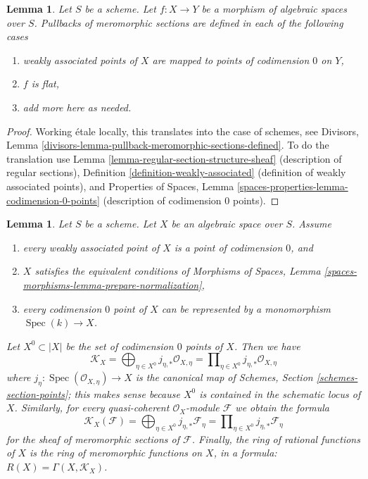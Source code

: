 \documentclass{stacks-project}
\theoremstyle{plain}
\newtheorem{lemma}[subsection]{Lemma}
\theoremstyle{definition}
\theoremstyle{remark}
\numberwithin{equation}{subsection}
\def\Spec{\mathop{\mathrm{Spec}}}
\begin{document}
\begin{lemma}
\label{lemma-pullback-meromorphic-sections-defined}
Let $S$ be a scheme. Let $f : X \to Y$ be a morphism of algebraic spaces
over $S$. Pullbacks of meromorphic sections are defined
in each of the following cases
\begin{enumerate}
\item weakly associated points of $X$ are mapped
to points of codimension $0$ on $Y$,
\item $f$ is flat,
\item add more here as needed.
\end{enumerate}
\end{lemma}

\begin{proof}
Working \'etale locally, this translates into the case of schemes, see
Divisors, Lemma \ref{divisors-lemma-pullback-meromorphic-sections-defined}.
To do the translation use Lemma \ref{lemma-regular-section-structure-sheaf}
(description of regular sections),
Definition \ref{definition-weakly-associated} (definition
of weakly associated points), and
Properties of Spaces, Lemma \ref{spaces-properties-lemma-codimension-0-points}
(description of codimension $0$ points).
\end{proof}

\begin{lemma}
\label{lemma-compute-meromorphic}
Let $S$ be a scheme. Let $X$ be an algebraic space over $S$. Assume
\begin{enumerate}
\item[(a)] every weakly associated point of $X$
is a point of codimension $0$, and
\item[(b)] $X$ satisfies the equivalent conditions
of Morphisms of Spaces, Lemma
\ref{spaces-morphisms-lemma-prepare-normalization},
\item[(c)] every codimension $0$ point of $X$ can be represented
by a monomorphism $\Spec(k) \to X$.
\end{enumerate}
Let $X^0 \subset |X|$ be the set of codimension $0$ points of $X$.
Then we have
$$
\mathcal{K}_X =
\bigoplus\nolimits_{\eta \in X^0} j_{\eta, *}\mathcal{O}_{X, \eta} =
\prod\nolimits_{\eta \in X^0} j_{\eta, *}\mathcal{O}_{X, \eta}
$$
where $j_\eta : \Spec(\mathcal{O}_{X, \eta}) \to X$ is the canonical map
of Schemes, Section \ref{schemes-section-points}; this makes sense because
$X^0$ is contained in the schematic locus of $X$. Similarly,
for every quasi-coherent $\mathcal{O}_X$-module $\mathcal{F}$
we obtain the formula
$$
\mathcal{K}_X(\mathcal{F}) =
\bigoplus\nolimits_{\eta \in X^0} j_{\eta, *}\mathcal{F}_\eta =
\prod\nolimits_{\eta \in X^0} j_{\eta, *}\mathcal{F}_\eta
$$
for the sheaf of meromorphic sections of $\mathcal{F}$.
Finally, the ring of rational functions of $X$ is the ring of meromorphic
functions on $X$, in a formula: $R(X) = \Gamma(X, \mathcal{K}_X)$.
\end{lemma}
\end{document}
